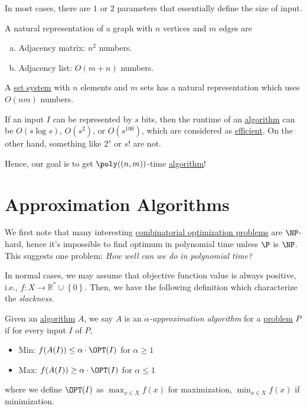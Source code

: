 \begin{note}
	In most cases, there are \(1\) or \(2\) parameters that essentially define the size of input.

	\begin{eg}[Graph]
		A natural representation of a graph with \(n\) vertices and \(m\) edges are
		\begin{enumerate}[(a)]
			\item Adjacency matrix: \(n ^{2} \) numbers.
			\item Adjacency list: \(O(m+n)\) numbers.
		\end{enumerate}
	\end{eg}

	\begin{eg}
		A \hyperref[def:set-system]{set system} with \(n\) elements and \(m\) sets has a natural representation which uses \(O(nm)\) numbers.
	\end{eg}
\end{note}

\begin{eg}
	If an input \(I\) can be represented by \(s\) bits, then the runtime of an \hyperref[def:algorithm]{algorithm} can be \(O(s \log s)\), \(O(s ^{2} )\), or \(O(s^{100} )\), which are considered as \hyperref[def:efficient]{efficient}. On the other hand, something like \(2^s\) or \(s!\) are not.
\end{eg}

Hence, our goal is to get \(\poly((n, m))\)-time \hyperref[def:algorithm]{algorithm}!

\section{Approximation Algorithms}
We first note that many interesting \hyperref[def:combinatorial-optimization]{combinatorial optimization problems} are \(\NP\)-hard, hence it's impossible to find optimum in polynomial time unless \(\P\) is \(\NP\). This suggests one problem: \emph{How well can we do in polynomial time?}

In normal cases, we may assume that objective function value is always positive, i.e., \(f\colon X \to \mathbb{R} ^* \cup \left\{ 0 \right\} \). Then, we have the following definition which characterize the \emph{slackness}.

\begin{definition}\label{def:approximation-algorithm}
	Given an \hyperref[def:algorithm]{algorithm} \(A\), we say \(A\) is an \emph{\(\alpha\)-approximation algorithm} for a \hyperref[def:computational-problem]{problem} \(P\) if for every input \(I\) of \(P\),
	\begin{itemize}
		\item Min: \(f(A(I)) \leq \alpha \cdot \OPT (I)\) for \(\alpha \geq 1\)
		\item Max: \(f(A(I)) \geq \alpha \cdot \OPT (I)\) for \(\alpha \leq 1\)
	\end{itemize}
	where we define \(\OPT(I)\) as \(\max _{x\in X}f(x)\) for maximization, \(\min _{x\in X}f(x)\) if minimization.
\end{definition}


